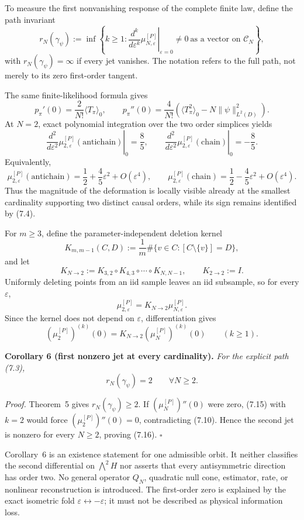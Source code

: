 \documentclass[11pt]{article}
\begin{document}
To measure the first nonvanishing response of the complete finite law, define the path invariant \[ r_N(\gamma_\psi) :=\inf\left\{k\ge1: \left.\frac{d^k}{d\varepsilon^k} \mu_{N,\varepsilon}^{[P]}\right|_{\varepsilon=0} \ne0\ \text{as a vector on }\mathcal C_N\right\}, \tag{7.8} \] with \(r_N(\gamma_\psi)=\infty\) if every jet vanishes. The notation refers to the full path, not merely to its zero first-order tangent.

The same finite-likelihood formula gives \[ p_\pi'(0)=\frac2{N!}\langle T_\pi\rangle_0, \qquad p_\pi''(0)=\frac4{N!} \left(\langle T_\pi^2\rangle_0-N\|\psi\|_{L^2(D)}^2\right). \tag{7.9} \] At \(N=2\), exact polynomial integration over the two order simplices yields \[ \boxed{ \left.\frac{d^2}{d\varepsilon^2} \mu_{2,\varepsilon}^{[P]}(\mathrm{antichain})\right|_{0}=\frac85, \qquad \left.\frac{d^2}{d\varepsilon^2} \mu_{2,\varepsilon}^{[P]}(\mathrm{chain})\right|_{0}=-\frac85.} \tag{7.10} \] Equivalently, \[ \mu_{2,\varepsilon}^{[P]}(\mathrm{antichain}) =\frac12+\frac45\varepsilon^2+O(\varepsilon^4), \qquad \mu_{2,\varepsilon}^{[P]}(\mathrm{chain}) =\frac12-\frac45\varepsilon^2+O(\varepsilon^4). \tag{7.11} \] Thus the magnitude of the deformation is locally visible already at the smallest cardinality supporting two distinct causal orders, while its sign remains identified by (7.4).

For \(m\ge3\), define the parameter-independent deletion kernel \[ K_{m,m-1}(C,D) :=\frac1m\#\{v\in C:[C\setminus\{v\}]=D\}, \tag{7.12} \] and let \[ K_{N\to2}:=K_{3,2}\circ K_{4,3}\circ\cdots\circ K_{N,N-1}, \qquad K_{2\to2}:=I. \tag{7.13} \] Uniformly deleting points from an iid sample leaves an iid subsample, so for every \(\varepsilon\), \[ \mu_{2,\varepsilon}^{[P]} =K_{N\to2}\mu_{N,\varepsilon}^{[P]}. \tag{7.14} \] Since the kernel does not depend on \(\varepsilon\), differentiation gives \[ \left(\mu_2^{[P]}\right)^{(k)}(0) =K_{N\to2}\left(\mu_N^{[P]}\right)^{(k)}(0) \qquad(k\ge1). \tag{7.15} \]

\textbf{Corollary 6 (first nonzero jet at every cardinality).} \emph{For the explicit path (7.3),} \[ \boxed{r_N(\gamma_\psi)=2\qquad\forall N\ge2.} \tag{7.16} \]

\emph{Proof.} Theorem~5 gives \(r_N(\gamma_\psi)\ge2\). If \((\mu_N^{[P]})''(0)\) were zero, (7.15) with \(k=2\) would force \((\mu_2^{[P]})''(0)=0\), contradicting (7.10). Hence the second jet is nonzero for every \(N\ge2\), proving (7.16). \(\square\)

Corollary~6 is an existence statement for one admissible orbit. It neither classifies the second differential on \(\bigwedge^2H\) nor asserts that every antisymmetric direction has order two. No general operator \(Q_N\), quadratic null cone, estimator, rate, or nonlinear reconstruction is introduced. The first-order zero is explained by the exact isometric fold \(\varepsilon\leftrightarrow-\varepsilon\); it must not be described as physical information loss.
\end{document}
